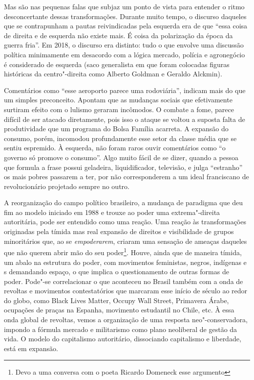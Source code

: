 Mas são nas pequenas falas que subjaz um ponto de vista para entender o
ritmo desconcertante dessas transformações. Durante muito tempo, o
discurso daqueles que se contrapunham a pautas reivindicadas pela
esquerda era de que ``essa coisa de direita e de esquerda não existe
mais. É coisa da polarização da época da guerra fria''. Em 2018, o
discurso era distinto: tudo o que envolve uma discussão política
minimamente em desacordo com a lógica mercado, polícia e agronegócio é
considerado de esquerda (saco generalista em que foram colocadas figuras
históricas da centro"-direita como Alberto Goldman e Geraldo Alckmin).

Comentários como ``esse aeroporto parece uma rodoviária'', indicam mais
do que um simples preconceito. Apontam que as mudanças sociais que
efetivamente surtiram efeito com o lulismo geraram incômodos. O combate
a fome, parece difícil de ser atacado diretamente, pois isso o ataque se
voltou a suposta falta de produtividade que um programa do Bolsa Família
acarreta. A expansão do consumo, porém, incomodou profundamente esse
setor da classe média que se sentiu espremido. À esquerda, não foram
raros ouvir comentários como ``o governo só promove o consumo''. Algo
muito fácil de se dizer, quando a pessoa que formula a frase possui
geladeira, liquidificador, televisão, e julga ``estranho'' os mais
pobres passarem a ter, por não corresponderem a um ideal franciscano de
revolucionário projetado sempre no outro.

A reorganização do campo político brasileiro, a mudança de paradigma que
deu fim ao modelo iniciado em 1988 e trouxe ao poder uma extrema"-direita
autoritária, pode ser entendido como uma reação. Uma reação às
transformações originadas pela tímida mas real expansão de direitos e
visibilidade de grupos minoritários que, ao se \emph{empoderarem},
criaram uma sensação de ameaças daqueles que não querem abrir mão do seu
poder\footnote{Devo a uma conversa com o poeta Ricardo
  Domeneck esse argumento}. Houve, ainda que de maneira tímida, um
abalo na estrutura do poder, com movimentos feministas, negros,
indígenas e s demandando espaço, o que implica o questionamento de
outras formas de poder. Pode"-se correlacionar o que aconteceu no Brasil
também com a onda de revoltas e movimentos contestatórios que marcaram
esse início de século  ao redor do globo, como Black Lives Matter,
Occupy Wall Street, Primavera Árabe, ocupações de praças na Espanha,
movimento estudantil no Chile, etc. À essa onda global de revoltas,
vemos a organização de uma resposta neo"-conservadora, impondo a fórmula
mercado e militarismo como plano neoliberal de gestão da vida. O modelo
do capitalismo autoritário, dissociando capitalismo e liberdade, está em
expansão.

